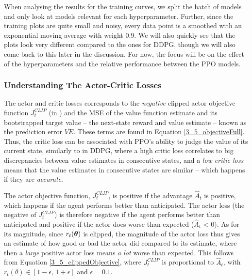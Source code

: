 When analysing the results for the training curves, we split the batch of models and only look at models relevant for each hyperparameter. Further, since the training plots are quite small and noisy, every data point is a smoothed with an exponential moving average with weight 0.9. We will also quickly see that the plots look very different compared to the ones for DDPG, though we will also come back to this later in the discussion. For now, the focus will be on the effect of the hyperparameters and the relative performance between the PPO models.

\subsubsection{Understanding The Actor-Critic Losses}
The actor and critic losses corresponds to the \textit{negative} clipped actor objective function $J_t^{CLIP}$ (in \cite{baselines}) and the MSE of the value function estimate and its bootstrapped target value -- the next-state reward and value estimate -- known as the prediction error $\overline{VE}$. These terms are found in Equation \eqref{3_5_objectiveFull}. 
Thus, the critic loss can be associated with PPO's ability to judge the value of its current state, similarly to in DDPG, where a high critic loss correlates to big discrepancies between value estimates in consecutive states, and a \textit{low critic loss} means that the value estimates in consecutive states are similar -- which happens if they are \textit{accurate}.

The actor objective function, $J_t^{CLIP}$, is positive if the advantage $\hat{A}_t$ is positive, which happens if the agent performs better than anticipated. The actor loss (the negative of  $J_t^{CLIP}$) is therefore negative if the agent performs better than anticipated and positive if the actor does worse than expected ($\hat{A}_t$ < 0). As for its magnitude, since $r_t(\boldsymbol{\theta})$ is clipped, the magnitude of the actor loss thus gives an estimate of how good or bad the actor did compared to its estimate, where then a \textit{large} positive actor loss means \textit{a lot} worse than expected. This follows from Equation \eqref{3_5_clippedObjective}, where $J_t^{CLIP}$ is proportional to $\hat{A}_t$, with $r_t(\theta) \in [1-\epsilon,\, 1+\epsilon]$ and $\epsilon = 0.1$. 


